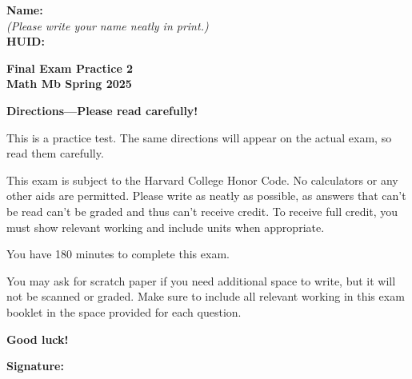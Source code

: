 \documentclass{article}
\begin{document}
{\large \mbox{} \hfill \bf Name:\underline{\hspace{3in}}}\\[2pt]
{\mbox{} \hfill \it (Please write your name neatly in print.)}\\[12pt]
{\large \mbox{} \hfill \bf HUID:\underline{\hspace{3in}}}
 
\medskip
 
\noindent
{\large\bf
Final Exam Practice 2\\
Math Mb Spring 2025}
\noindent


{\Large
\begin{center}\textbf{Directions---Please read carefully!} \end{center}}

This is a practice test. The same directions will appear on the actual exam, so read them carefully.

\hrulefill 


This exam is subject to the Harvard College Honor Code. No calculators or any other aids are permitted.  Please write as neatly as possible, as answers that can't be read can't be graded and thus can't receive credit. To receive full credit, you must show relevant working
and include units when appropriate. 

You have 180 minutes to complete this exam. 

You may ask for scratch paper if you need additional space to write, but it will not be scanned or graded. Make sure to include all relevant working in this exam booklet in the space provided for each question.

\begin{center}\textbf{Good luck!}\end{center}


\vfill

\vspace{0.3in}

{\large \mbox{} \hfill \bf Signature:\underline{\hspace{3in}}}
\thispagestyle{empty}

\newpage
\end{document}
